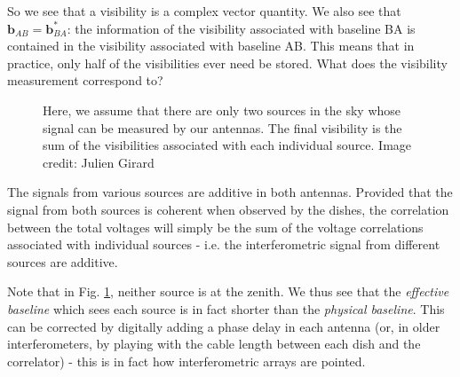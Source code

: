 \pg
So we see that a visibility is a complex vector quantity. We also see that $\mathbf{b}_{AB} = \mathbf{b}_{BA}^*$: the information of the visibility associated with baseline BA is contained in the visibility associated with baseline AB. This means that in practice, only half of the visibilities ever need be stored. What does the visibility measurement correspond to?
\begin{figure}[h]
\centering
{}
\caption{\label{fig.visibility.measure} Here, we assume that there are only two sources in the sky whose signal can be measured by our antennas. The final visibility is the sum of the visibilities associated with each individual source. Image credit: Julien Girard}
\end{figure}

\pg
The signals from various sources are additive in both antennas. Provided that the signal from both sources is coherent when observed by the dishes, the correlation between the total voltages will simply be the sum of the voltage correlations associated with individual sources - i.e. the interferometric signal from different sources are additive.

\pg
Note that in Fig. \ref{fig.visibility.measure}, neither source is at the zenith. We thus see that the \emph{effective baseline} which sees each source is in fact shorter than the \emph{physical baseline}. This can be corrected by digitally adding a phase delay in each antenna (or, in older interferometers, by playing with the cable length between each dish and the correlator) - this is in fact how interferometric arrays are pointed.

